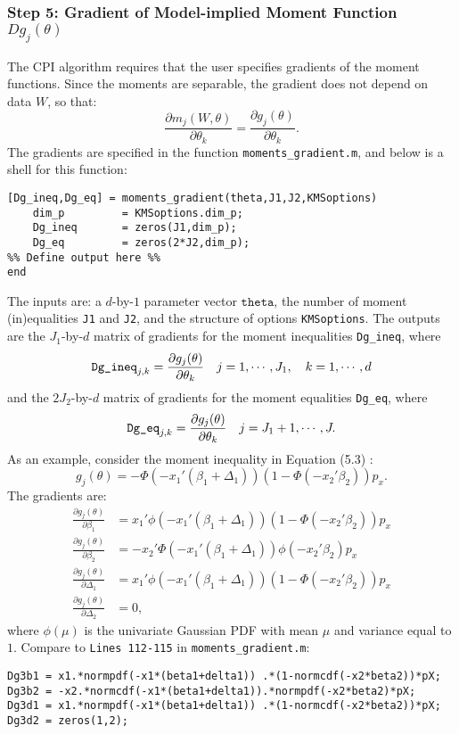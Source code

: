 \documentclass[12pt]{article}
\def\code#1{\texttt{#1}}
\begin{document}
\subsubsection*{Step 5: Gradient of Model-implied Moment Function $Dg_j(\theta)$}
The CPI algorithm requires that the user specifies gradients of the moment functions.  Since the moments are separable, the gradient does not depend on data $W$, so that:
\[
\frac{\partial m_j(W,\theta)}{\partial \theta_k} = \frac{\partial g_j(\theta)}{\partial \theta_k}.
\]
The gradients are specified in  the function \code{moments\_gradient.m}, and below is a shell for this function:
\footnotesize
\begin{lstlisting}[backgroundcolor = \color{gray!30},
                   xleftmargin = 0cm,
                   framexleftmargin = 1em]
[Dg_ineq,Dg_eq] = moments_gradient(theta,J1,J2,KMSoptions)
    dim_p         = KMSoptions.dim_p;
    Dg_ineq       = zeros(J1,dim_p);
    Dg_eq         = zeros(2*J2,dim_p);
%% Define output here %%
end
\end{lstlisting} \normalsize
The inputs are: a $d$-by-$1$ parameter vector $\code{theta}$, the number of moment (in)equalities \code{J1} and \code{J2}, and the structure of options \code{KMSoptions}.  The outputs are the $J_1$-by-$d$ matrix of gradients for the moment inequalities \code{Dg\_ineq}, where
\begin{align*}
\text{\code{Dg\_ineq}}_{j,k} = \frac{\partial g_j(\theta)}{\partial \theta_k} \quad j =1,\cdots,J_1,\quad  k =1,\cdots,d
\end{align*}
and the $2 J_2$-by-$d$ matrix of gradients for the moment equalities \code{Dg\_eq}, where
\begin{align*}
\text{\code{Dg\_eq}}_{j,k} = \frac{\partial g_j(\theta)}{\partial \theta_k} \quad j =J_1+1,\cdots,J.
\end{align*}
As an example, consider the moment inequality in Equation (5.3) :
\[
g_j(\theta) = - \Phi(-x_1'(\beta_1 + \Delta_1))(1- \Phi(-x_2'\beta_2))p_x.
\]
The gradients are:
\begin{align*}
\frac{\partial g_j(\theta)}{\partial \beta_1} & = x_1' \phi(-x_1'(\beta_1 + \Delta_1))(1-\Phi(-x_2'\beta_2))p_x \\
\frac{\partial g_j(\theta)}{\partial \beta_2} & = -x_2' \Phi(-x_1'(\beta_1 + \Delta_1))\phi(-x_2'\beta_2)p_x \\
\frac{\partial g_j(\theta)}{\partial \Delta_1} & = x_1' \phi(-x_1'(\beta_1 + \Delta_1))(1-\Phi(-x_2'\beta_2))p_x \\
\frac{\partial g_j(\theta)}{\partial \Delta_2} & =0,
\end{align*}
where $\phi(\mu)$ is the univariate Gaussian PDF with mean $\mu$ and variance equal to $1$. Compare to \code{Lines 112-115} in \code{moments\_gradient.m}:
\footnotesize
    \begin{lstlisting}[backgroundcolor = \color{gray!30},
                   xleftmargin = 0cm,
                   framexleftmargin = 1em]
Dg3b1 = x1.*normpdf(-x1*(beta1+delta1)) .*(1-normcdf(-x2*beta2))*pX;
Dg3b2 = -x2.*normcdf(-x1*(beta1+delta1)).*normpdf(-x2*beta2)*pX;
Dg3d1 = x1.*normpdf(-x1*(beta1+delta1)) .*(1-normcdf(-x2*beta2))*pX;
Dg3d2 = zeros(1,2);
    \end{lstlisting}\normalsize
\end{document}
